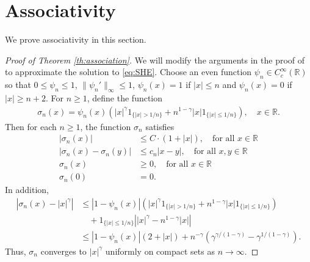 \documentclass[12pt, reqno]{amsart}
\newcommand{\R}{{\mathbb{R}}}
\newcommand{\<}{\langle}
\renewcommand{\>}{\rangle}
\begin{document}
\section{Associativity}\label{se:ass}


We prove associativity in this section.

 \begin{proof}[Proof of Theorem \ref{th:association}]
          We will modify the arguments in the proof of \cite[Theorem 1.1]{MP11} to approximate the solution to \eqref{eq:SHE}.
          Choose an even function $\psi_n \in C_c^{\infty}(\R)$ so that 
$0\leq \psi_n\leq 1$, $\|\psi_n'\|_\infty \leq 1$, $\psi_n(x)=1$ if 
$|x|\leq n$ and $\psi_n(x)=0$ if $|x|\geq n+2$. For $n\geq 1$, define the 
function
\begin{align*}
\sigma_n(x)= \psi_n(x) \left(|x|^\gamma1_{\{|x|>1/n\}} + n^{1-\gamma}|x|1_{\{|x|\leq 1/n\}}\right), \quad x\in \R.
\end{align*}
Then for each $n\geq1$, the function $\sigma_n$ satisfies 
\begin{align}
|\sigma_n(x)|& \leq C\cdot(1+|x|), \quad\text{for all $x\in \R$} \nonumber\\
|\sigma_n(x)-\sigma_n(y)| &\leq c_n|x-y|, \quad \text{for all $x, y\in \R$} \label{eq:lip}\\
\sigma_n(x) &\geq 0, \quad\text{for all $x\in \R$} \label{eq:ass}\\
\sigma_n(0)&=0. \label{eq:non}
\end{align}
In addition,
\begin{align*}
          \left|\sigma_n(x)- |x|^\gamma\right| &\leq |1-\psi_n(x)| \left(|x|^\gamma1_{\{|x|>1/n\}} + n^{1-\gamma}|x|1_{\{|x|\leq 1/n\}}\right)\\
          &\quad + 1_{\{|x|\leq 1/n\}} \left||x|^\gamma- n^{1-\gamma}|x|\right|\\
          &\leq  |1-\psi_n(x)| (2+|x|) + n^{-\gamma}\left(\gamma^{\gamma/(1-\gamma)}- \gamma^{1/(1-\gamma)}\right).
\end{align*}
Thus, $\sigma_n$ converges to $|x|^\gamma$ uniformly on compact sets as $n\to \infty$. 



\end{proof}
\end{document}
